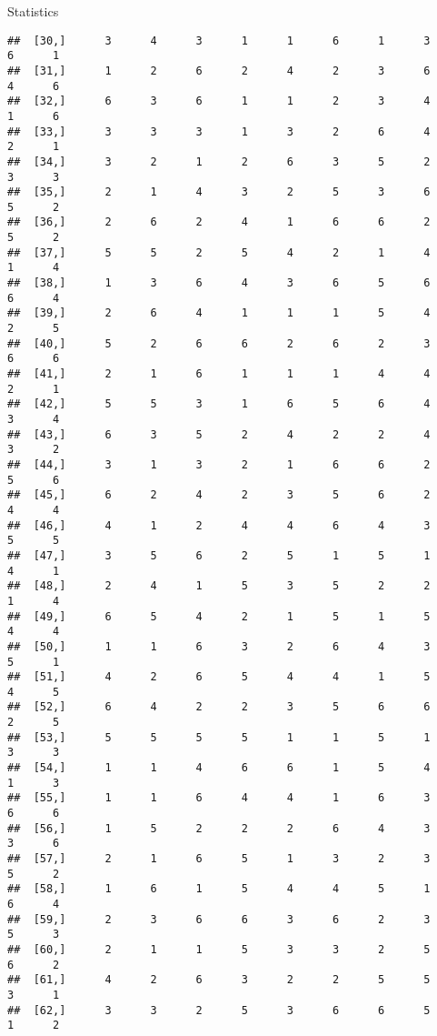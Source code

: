 \documentclass[
  ignorenonframetext,
]{beamer}
\begin{document}
\begin{frame}[fragile]{Statistics}
\begin{verbatim}
##  [30,]      3      4      3      1      1      6      1      3      6      1
##  [31,]      1      2      6      2      4      2      3      6      4      6
##  [32,]      6      3      6      1      1      2      3      4      1      6
##  [33,]      3      3      3      1      3      2      6      4      2      1
##  [34,]      3      2      1      2      6      3      5      2      3      3
##  [35,]      2      1      4      3      2      5      3      6      5      2
##  [36,]      2      6      2      4      1      6      6      2      5      2
##  [37,]      5      5      2      5      4      2      1      4      1      4
##  [38,]      1      3      6      4      3      6      5      6      6      4
##  [39,]      2      6      4      1      1      1      5      4      2      5
##  [40,]      5      2      6      6      2      6      2      3      6      6
##  [41,]      2      1      6      1      1      1      4      4      2      1
##  [42,]      5      5      3      1      6      5      6      4      3      4
##  [43,]      6      3      5      2      4      2      2      4      3      2
##  [44,]      3      1      3      2      1      6      6      2      5      6
##  [45,]      6      2      4      2      3      5      6      2      4      4
##  [46,]      4      1      2      4      4      6      4      3      5      5
##  [47,]      3      5      6      2      5      1      5      1      4      1
##  [48,]      2      4      1      5      3      5      2      2      1      4
##  [49,]      6      5      4      2      1      5      1      5      4      4
##  [50,]      1      1      6      3      2      6      4      3      5      1
##  [51,]      4      2      6      5      4      4      1      5      4      5
##  [52,]      6      4      2      2      3      5      6      6      2      5
##  [53,]      5      5      5      5      1      1      5      1      3      3
##  [54,]      1      1      4      6      6      1      5      4      1      3
##  [55,]      1      1      6      4      4      1      6      3      6      6
##  [56,]      1      5      2      2      2      6      4      3      3      6
##  [57,]      2      1      6      5      1      3      2      3      5      2
##  [58,]      1      6      1      5      4      4      5      1      6      4
##  [59,]      2      3      6      6      3      6      2      3      5      3
##  [60,]      2      1      1      5      3      3      2      5      6      2
##  [61,]      4      2      6      3      2      2      5      5      3      1
##  [62,]      3      3      2      5      3      6      6      5      1      2

\end{verbatim}
\end{frame}
\end{document}
